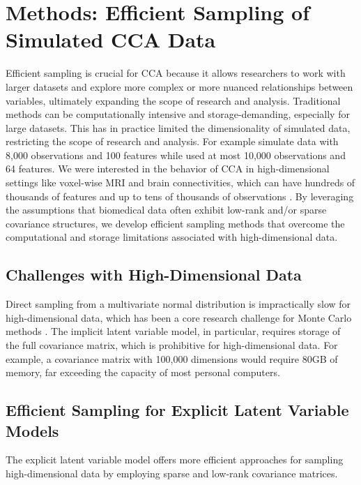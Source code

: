 \section{Methods: Efficient Sampling of Simulated CCA Data}\label{sec:efficient}

Efficient sampling is crucial for CCA because it allows researchers to work with larger datasets and explore more complex or more nuanced relationships between variables, ultimately expanding the scope of research and analysis. Traditional methods can be computationally intensive and storage-demanding, especially for large datasets.
This has in practice limited the dimensionality of simulated data, restricting the scope of research and analysis.
For example \citet{matkovic2023contribution} simulate data with 8,000 observations and 100 features while \citet{helmer2020stability} used at most 10,000 observations and 64 features.
We were interested in the behavior of CCA in high-dimensional settings like voxel-wise MRI and brain connectivities, which can have hundreds of thousands of features \citep{jack2008alzheimer} and up to tens of thousands of observations \citep{sudlow2015uk}.
By leveraging the assumptions that biomedical data often exhibit low-rank and/or sparse covariance structures, we develop efficient sampling methods that overcome the computational and storage limitations associated with high-dimensional data.

\subsection{Challenges with High-Dimensional Data}
Direct sampling from a multivariate normal distribution is impractically slow for high-dimensional data, which has been a core research challenge for Monte Carlo methods \citep{mackay1998introduction}. The implicit latent variable model, in particular, requires storage of the full covariance matrix, which is prohibitive for high-dimensional data. For example, a covariance matrix with 100,000 dimensions would require 80GB of memory, far exceeding the capacity of most personal computers.

\subsection{Efficient Sampling for Explicit Latent Variable Models}
The explicit latent variable model offers more efficient approaches for sampling high-dimensional data by employing sparse and low-rank covariance matrices.

